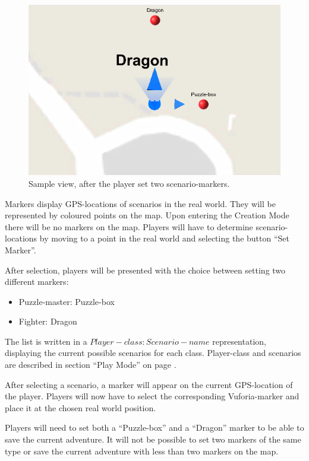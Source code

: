 \documentclass{sigchi-ext}
\begin{document}
\begin{figure}
	\includegraphics[width=1\columnwidth]{figures/CM_Markers}
	\caption{Sample view, after the player set two scenario-markers.}\label{fig:CM_Markers}
\end{figure}

Markers display GPS-locations of scenarios in the real world. They will be represented by coloured points on the map. Upon entering the Creation Mode there will be no markers on the map. Players will have to determine scenario-locations by moving to a point in the real world and selecting the button ``Set Marker''.

After selection, players will be presented with the choice between setting two different markers:
\begin{itemize}\compresslist%
	\item Puzzle-master: Puzzle-box
	\item Fighter: Dragon
\end{itemize}
The list is written in a $Player-class: Scenario-name$ representation, displaying the current possible scenarios for each class. Player-class and scenarios are described in section ``Play Mode'' on page \pageref{sec:Play}.

After selecting a scenario, a marker will appear on the current GPS-location of the player. Players will now have to select the corresponding Vuforia-marker and place it at the chosen real world position.

Players will need to set both a ``Puzzle-box'' and a ``Dragon'' marker to be able to save the current adventure. It will not be possible to set two markers of the same type or save the current adventure with less than two markers on the map.
\end{document}
